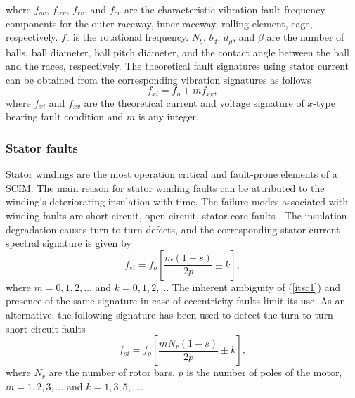 %
where ${f_{ov}}$, ${f_{irv}}$, ${f_{rv}}$, and ${f_{cv}}$ are the characteristic vibration fault frequency components for the outer raceway, inner raceway, rolling element, cage, respectively. $f_r$ is the rotational frequency. $N_b$, $b_d$, $d_\rho$, and $\beta$ are the number of balls, ball diameter, ball pitch diameter, and the contact angle between the ball and the races, respectively. The theoretical fault signatures using stator current can be obtained from the corresponding vibration signatures as follows
%
\begin{equation}
	\label{bearingCurrentSignature}
	f_{xi} = f_o \pm mf_{xv},
\end{equation}
where $f_{xi}$ and $f_{xv}$ are the theoretical current and voltage signature of $x$-type bearing fault condition and $m$ is any integer.
\subsubsection{Stator faults}
Stator windings are the most operation critical and fault-prone elements of a SCIM. The main reason for stator winding faults can be attributed to the winding's deteriorating insulation with time. The failure modes associated with winding faults are short-circuit, open-circuit, stator-core faults \cite{drif2014stator}. The insulation degradation causes turn-to-turn defects, and the corresponding stator-current spectral signature is given by
\begin{equation}
	\label{itsc1}
	{f_{si}} = {f_o}\left[ {\frac{{m\left( {1 - s} \right)}}{{2p}} \pm k} \right],
\end{equation}
where $m=0,1,2,\ldots$ and $k=0,1,2,\ldots$ The inherent ambiguity of (\ref{itsc1}) and presence of the same signature in case of eccentricity faults limit its use. As an alternative, the following signature has been used to detect the turn-to-turn short-circuit faults \cite{wolkiewicz2016online}
\begin{equation}
	\label{itsc2}
	{f_{si}} = {f_o}\left[ {\frac{{m{N_r}\left( {1 - s} \right)}}{{2p}} \pm k} \right],
\end{equation}
where $N_r$ are the number of rotor bars, $p$ is the number of poles of the motor, $m=1,2,3,\ldots$ and $k=1,3,5,\ldots.$
